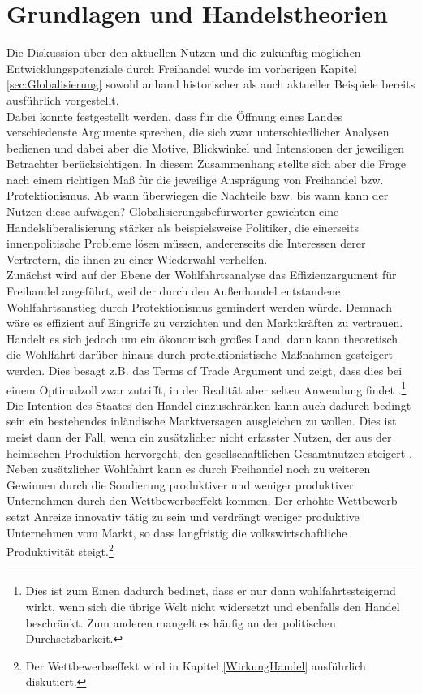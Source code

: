 \section{Grundlagen und Handelstheorien}\label{Handelstheorien}
Die Diskussion über den aktuellen Nutzen und die zukünftig möglichen Entwicklungspotenziale durch Freihandel wurde im vorherigen Kapitel \ref{sec:Globalisierung} sowohl anhand historischer als auch aktueller Beispiele bereits ausführlich vorgestellt. \\
%
 Dabei konnte festgestellt werden, dass für die Öffnung eines Landes  verschiedenste Argumente sprechen, die sich zwar unterschiedlicher Analysen bedienen und dabei aber die Motive, Blickwinkel und Intensionen der jeweiligen Betrachter berücksichtigen. In diesem Zusammenhang stellte sich aber die Frage nach einem richtigen Maß für die jeweilige Ausprägung von Freihandel bzw. Protektionismus. Ab wann überwiegen die Nachteile bzw.  bis wann kann der Nutzen diese aufwägen? Globalisierungsbefürworter gewichten eine Handelsliberalisierung stärker als beispielsweise Politiker, die einerseits innenpolitische Probleme lösen müssen, andererseits die Interessen derer Vertretern, die ihnen zu einer Wiederwahl verhelfen.\\
%
 Zunächst wird auf der Ebene der Wohlfahrtsanalyse das Effizienzargument für Freihandel angeführt, weil der durch den Außenhandel entstandene Wohlfahrtsanstieg durch Protektionismus gemindert werden würde. Demnach wäre es effizient auf Eingriffe zu verzichten und den Marktkräften zu vertrauen.
Handelt es sich jedoch um ein ökonomisch großes Land, dann kann theoretisch die Wohlfahrt darüber hinaus durch protektionistische Maßnahmen gesteigert werden. Dies besagt z.B. das Terms of Trade Argument und zeigt, dass dies bei einem Optimalzoll zwar zutrifft, in der Realität aber selten Anwendung findet \cite{Ventura.1997,Acemoglu.2002}.\footnote{Dies ist zum Einen dadurch bedingt, dass er nur dann wohlfahrtssteigernd wirkt, wenn sich die übrige Welt nicht widersetzt und ebenfalls den Handel beschränkt. Zum anderen mangelt es häufig an der politischen Durchsetzbarkeit.}\\
%
 Die Intention des Staates den Handel einzuschränken kann auch dadurch bedingt sein ein bestehendes inländische Marktversagen ausgleichen zu wollen. Dies ist meist dann der Fall, wenn ein zusätzlicher nicht erfasster Nutzen, der aus der heimischen Produktion hervorgeht, den gesellschaftlichen Gesamtnutzen steigert \cite[Kapitel 10]{Krugman.2015}.\\
%
Neben zusätzlicher Wohlfahrt kann es durch Freihandel noch zu weiteren Gewinnen durch die Sondierung produktiver und weniger produktiver Unternehmen durch den Wettbewerbseffekt kommen. Der erhöhte Wettbewerb setzt Anreize innovativ tätig zu sein und verdrängt weniger produktive Unternehmen vom Markt, so dass lang\-fri\-stig die volkswirtschaftliche Produktivität steigt.\footnote{Der Wettbewerbseffekt wird in Kapitel \ref{WirkungHandel} ausführlich diskutiert.} \\

